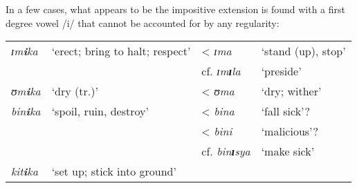 In a few cases, what appears to be the impositive extension is found with a first degree vowel /i/ that cannot be accounted for by any regularity:
\begin{exe}
\ex
\begin{tabular}[t]{llll}
\textit{ɪm\textbf{i}ka}&\lq erect; bring to halt; respect'& < \textit{ɪma}&`stand (up), stop'\\
&& cf. \textit{ɪm\textbf{ɪ}la} & `preside'\\
\textit{ʊm\textbf{i}ka}& `dry (tr.)' & < \textit{ʊma} & `dry; wither'\\
\textit{bin\textbf{i}ka} & `spoil, ruin, destroy' & < \textit{bina} &`fall sick'?\\
&&< \textit{bini}&`malicious'?\\
&&cf. \textit{bin\textbf{ɪ}sya}&`make sick'\\
\textit{kit\textbf{i}ka}&`set up; stick into ground'
\end{tabular}
\end{exe}
